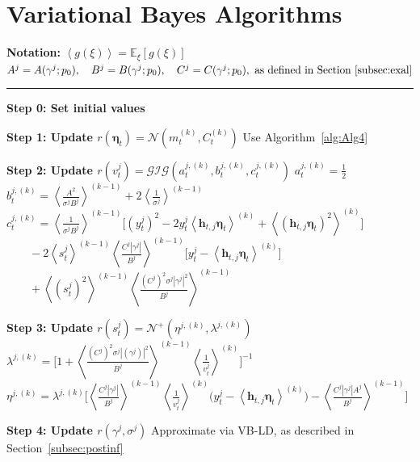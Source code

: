 \documentclass[APA,STIX1COL]{WileyNJD-v2}
\begin{document}
 \clearpage


\section{Variational Bayes Algorithms}

\begin{algorithm}
\caption{Variational Bayes (VB) Algorithm}
\label{alg:Alg3}
\begin{algorithmic}

\State \textbf{Notation:}
\State  $\left\langle g(\xi) \right\rangle = \mathbb{E}_\xi\left[ g(\xi) \right]$
\State  \(
A^j = A(\gamma^j;p_0), \quad B^j = B(\gamma^j;p_0), \quad C^j = C(\gamma^j;p_0), \text{ as defined in Section~\ref{subsec:exal}}
\)
\vspace{0.1cm}
\Statex \rule{\linewidth}{0.4pt}
\vspace{0.1cm}

\State \textbf{Step 0: Set initial values}

    \State \textbf{Step 1: Update $r(\boldsymbol{\eta}_t)=\mathcal{N}(m^{(k)}_t,C^{(k)}_t)$}
    \State Use Algorithm~\ref{alg:Alg4}

        \State \textbf{Step 2: Update $r(v^j_t)=\mathcal{GIG}(a_t^{j,(k)},b_t^{j,(k)},c_t^{j,(k)})$}
            \State $a_t^{j,(k)} = \frac{1}{2}$
            \State $b_t^{j,(k)} = \left\langle \frac{A^2}{\sigma^j B^j} \right\rangle^{(k-1)} + 2 \left\langle \frac{1}{\sigma^j} \right\rangle^{(k-1)}$
            \State $c_t^{j,(k)} = \left\langle \frac{1}{\sigma^j B^j} \right\rangle^{(k-1)} \Big[ (y_t^j)^2 - 2y_t^j \left\langle  \mathbf{h}_{t,j} \boldsymbol{\eta}_t \right\rangle^{(k)} + \left\langle (  \mathbf{h}_{t,j} \boldsymbol{\eta}_t )^2 \right\rangle^{(k)} \Big]$
            \State $\quad \quad -2 \left\langle s^j_t \right\rangle^{(k-1)} \left\langle \frac{C^j|\gamma^j|}{B^j} \right\rangle^{(k-1)} \Big[ y_t^j - \left\langle  \mathbf{h}_{t,j} \boldsymbol{\eta}_t \right\rangle^{(k)} \Big]$
            \State $\quad \quad + \left\langle (s^j_t)^2 \right\rangle^{(k-1)} \left\langle \frac{(C^j)^2\sigma^j|\gamma^j|^2}{B^j} \right\rangle^{(k-1)}$
        \EndFor

        \State \textbf{Step 3: Update $r(s^j_t)=\mathcal{N}^+(\eta^{j,(k)},\lambda^{j,(k)})$}
            \State $\lambda^{j,(k)} = \Big[ 1+\left\langle \frac{(C^j)^2 \sigma^j |(\gamma^j)|^2}{B^j} \right\rangle^{(k-1)} \left\langle \frac{1}{v^j_t} \right\rangle^{(k)} \Big]^{-1}$
            \State $\eta^{j,(k)} = \lambda^{j,(k)}  \Big[ \left\langle \frac{C^j |\gamma^j|}{B^j} \right\rangle^{(k-1)} \left\langle \frac{1}{v^j_t} \right\rangle^{(k)} \Big( y_t^j - \left\langle  \mathbf{h}_{t,j} \boldsymbol{\eta}_t \right\rangle^{(k)} \Big) - \left\langle \frac{C^j |\gamma^j| A^j}{B^j} \right\rangle^{(k-1)} \Big]$
        \EndFor

        \State \textbf{Step 4: Update $r(\gamma^j, \sigma^j )$}
        \State Approximate via VB-LD, as described in Section~\ref{subsec:postinf}
    \EndFor
\EndWhile

\end{algorithmic}
\end{algorithm}
\end{document}
